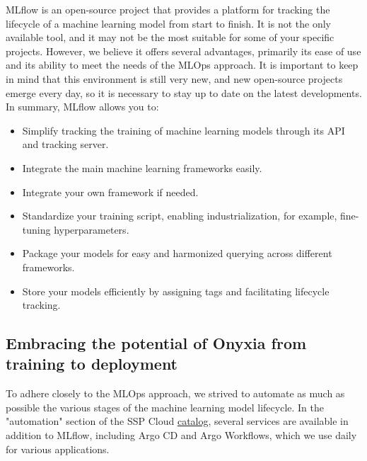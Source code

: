 MLflow is an open-source project that provides a platform for tracking the lifecycle of a machine learning model from start to finish. It is not the only available tool, and it may not be the most suitable for some of your specific projects. However, we believe it offers several advantages, primarily its ease of use and its ability to meet the needs of the MLOps approach. It is important to keep in mind that this environment is still very new, and new open-source projects emerge every day, so it is necessary to stay up to date on the latest developments. In summary, MLflow allows you to:

\begin{itemize}
    \item Simplify tracking the training of machine learning models through its API and tracking server.
    \item Integrate the main machine learning frameworks easily.
    \item Integrate your own framework if needed.
    \item Standardize your training script, enabling industrialization, for example, fine-tuning hyperparameters.
    \item Package your models for easy and harmonized querying across different frameworks.
    \item Store your models efficiently by assigning tags and facilitating lifecycle tracking.
\end{itemize}



\subsection{Embracing the potential of Onyxia from training to deployment}

To adhere closely to the MLOps approach, we strived to automate as much as possible the various stages of the machine learning model lifecycle. In the "automation" section of the SSP Cloud \href{https://datalab.sspcloud.fr/catalog/automation}{catalog}, several services are available in addition to MLflow, including Argo CD and Argo Workflows, which we use daily for various applications.

